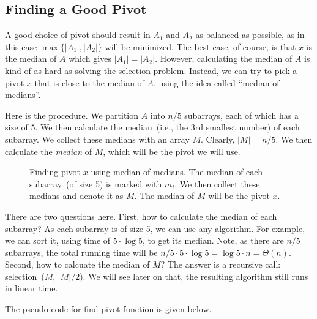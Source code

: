 \subsection*{Finding a Good Pivot}

A good choice of pivot should result in $A_1$ and $A_2$ as balanced as possible, as in this case 
$\max\{|A_1|, |A_2|\}$ will be minimized. %
The best case, of course, is that $x$ is the median of $A$ which gives $|A_1| = |A_2|$. 
However, calculating the median of $A$ is kind of as hard as solving the selection problem.
Instead, we can try to pick a pivot $x$ that is close to the median of $A$, using the idea called ``median of medians''.

Here is the procedure. We partition $A$ into $n/5$ subarrays, each of which has a size of 5.
We then calculate the median~(i.e., the 3rd smallest number) of each subarray. We collect these medians
with an array $M$. Clearly, $|M| = n/5$. We then calculate the \emph{median} of $M$, which will be the pivot we will use.

\begin{figure}[h!]
\centering{}
\caption{Finding pivot $x$ using median of medians. The median of each subarray~(of size 5) is marked with $m_i$.
We then collect these medians and denote it as $M$. The median of $M$ will be the pivot $x$.}
\label{fig:median}
\end{figure}

There are two questions here. First, how to calculate the median of each subarray?
As each subarray is of size 5, we can use any algorithm. For example, we can sort it, using time of $5 \cdot \log 5$, to get its median.
Note, as there are $n/5$ subarrays, the total running time will be $n/5\cdot 5\cdot \log 5 = \log 5\cdot n = \Theta(n)$.
Second, how to calcuate the median of $M$? The answer is a recursive call: selection~($M$, $|M|/2$).
We will see later on that, the resulting algorithm still runs in linear time.

The pseudo-code for find-pivot function is given below.

\begin{minipage}{0.8\textwidth}
	\xxx
	\aab {\textcolor{blue}{if $|A| < 5$: find~(e.g., by sorting $A$) and return the median of $A$;}}\xxx
	\xxx
	\xxx
	\xxx
	\xxx
	\xxx
\end{minipage}

